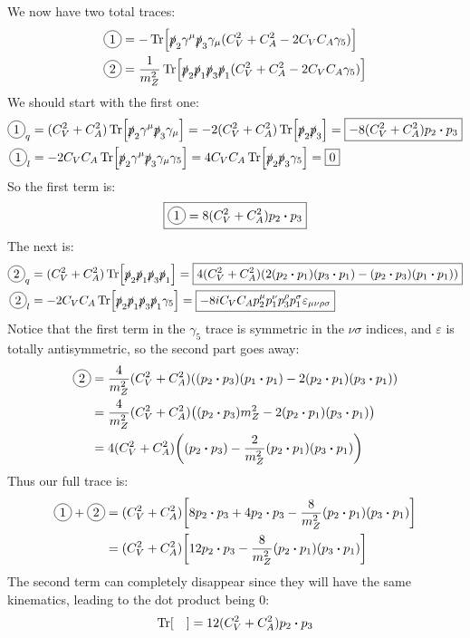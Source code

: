 \documentclass[12pt]{article}
\newcommand*\circd[1]{\tikz[baseline=(char.base)]{
            \node[shape=circle,draw,inner sep=2pt] (char) {#1};}}
\newcommand{\g}{\gamma}
\newcommand{\sla}[1]{\slashed{#1}}
\renewcommand{\sp}{\slashed{p}}
\newcommand{\munu}{{\mu\nu}}
\newcommand{\veps}{\varepsilon}
\begin{document}
We now have two total traces:
\begin{align*}
  \circd1&=-\Tr[\sla{p}_2\g^\mu\sla{p}_3\g_\mu(C_V^2+C_A^2-2C_VC_A\g_5)]\\
  \circd2&=\frac{1}{m_Z^2}
  \Tr[\sla{p}_2\sla{p}_1\sla{p}_3\sla{p}_1(C_V^2+C_A^2-2C_VC_A\g_5)]
\end{align*}
We should start with the first one:
\begin{align*}
  \circd1_q&=(C_V^2+C_A^2)\Tr[\sp_2\g^\mu\sp_3\g_\mu]=
  -2(C_V^2+C_A^2)\Tr[\sp_2\sp_3]=\boxed{-8(C_V^2+C_A^2)p_2\vdot p_3}\\
  \circd1_l&=-2C_VC_A\Tr[\sp_2\g^\mu\sp_3\g_\mu\g_5]=4C_VC_A\Tr[\sp_2\sp_3\g_5]=
  \boxed{0}
\end{align*}
So the first term is:
\begin{align*}
  \boxed{\circd1=8(C_V^2+C_A^2)p_2\vdot p_3}
\end{align*}
The next is:
\begin{align*}
  \circd2_q&=(C_V^2+C_A^2)\Tr[\sla{p}_2\sla{p}_1\sla{p}_3\sla{p}_1]
  =\boxed{4(C_V^2+C_A^2)\qty(2(p_2\vdot p_1)(p_3\vdot p_1)
  -(p_2\vdot p_3)(p_1\vdot p_1))}\\
  \circd2_l&=-2C_VC_A\Tr[\sla{p}_2\sla{p}_1\sla{p}_3\sla{p}_1\g_5]
  =\boxed{-8iC_VC_Ap_2^\mu p_1^\nu p_3^\rho p_1^\sigma
  \veps_{\munu\rho\sigma}}
\end{align*}
Notice that the first term in the $\g_5$ trace is symmetric in the $\nu\sigma$ indices, and $\veps$ is totally antisymmetric, so the second part goes away:
\begin{align*}
  \circd2&=\frac{4}{m_Z^2}(C_V^2+C_A^2)\qty((p_2\vdot p_3)(p_1\vdot p_1)
  -2(p_2\vdot p_1)(p_3\vdot p_1))\\
  &=\frac{4}{m_Z^2}(C_V^2+C_A^2)\qty((p_2\vdot p_3)m_Z^2
  -2(p_2\vdot p_1)(p_3\vdot p_1))\\
  &=4(C_V^2+C_A^2)\qty((p_2\vdot p_3)
  -\frac{2}{m_Z^2}(p_2\vdot p_1)(p_3\vdot p_1))\\
\end{align*}
Thus our full trace is:
\begin{align*}
  \circd1+\circd2&=(C_V^2+C_A^2)\qty[8p_2\vdot p_3+4p_2\vdot p_3
  -\frac{8}{m_Z^2}(p_2\vdot p_1)(p_3\vdot p_1)]\\
  &=(C_V^2+C_A^2)\qty[12p_2\vdot p_3
  -\frac{8}{m_Z^2}(p_2\vdot p_1)(p_3\vdot p_1)]
\end{align*}
The second term can completely disappear since they will have the same kinematics, leading to the dot product being $0$:
\begin{align*}
  \Tr[\quad]=12(C_V^2+C_A^2)p_2\vdot p_3
\end{align*}
\end{document}
